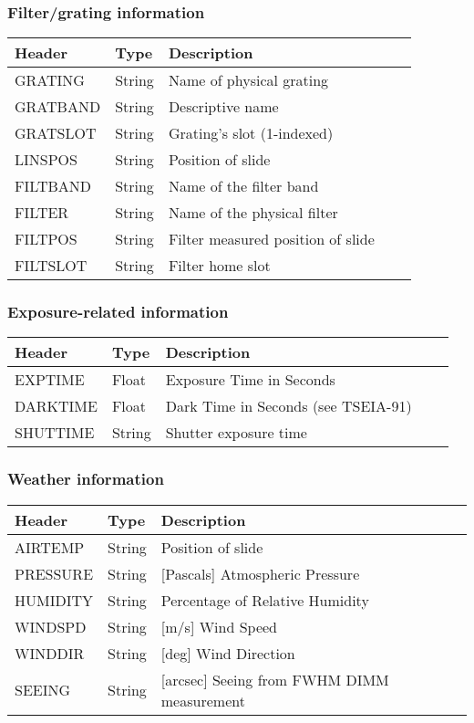 \subsubsection{Filter/grating information}
\begin{tabular}{l l l l l}

\hline
Header & Type & Description \\
\hline
GRATING & String & Name of physical grating \\
GRATBAND & String & Descriptive name \\
GRATSLOT & String & Grating's slot (1-indexed) \\
LINSPOS & String & Position of slide \\
FILTBAND & String & Name of the filter band \\
FILTER & String & Name of the physical filter \\
FILTPOS & String & Filter measured position of slide \\
FILTSLOT & String & Filter home slot \\
\hline
\end{tabular}


\subsubsection{Exposure-related information}
\begin{tabular}{l l l l l}

\hline
Header & Type & Description \\
\hline
EXPTIME & Float & Exposure Time in Seconds \\
DARKTIME & Float & Dark Time in Seconds (see TSEIA-91) \\
SHUTTIME & String & Shutter exposure time \\
\hline
\end{tabular}


\subsubsection{Weather information}
\begin{tabular}{l l l l l}

\hline
Header & Type & Description \\
\hline
AIRTEMP & String & Position of slide \\
PRESSURE & String & [Pascals] Atmospheric Pressure \\
HUMIDITY & String & Percentage of Relative Humidity \\
WINDSPD & String & [m/s] Wind Speed \\
WINDDIR & String & [deg] Wind Direction \\
SEEING & String & [arcsec] Seeing from FWHM DIMM measurement \\
\hline
\end{tabular}


